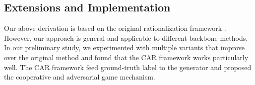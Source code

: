 \documentclass[letterpaper]{article} %
\begin{document}



\subsection{Extensions and Implementation}
Our above derivation is based on the original rationalization framework \cite{lei2016rationalizing}. However, our approach is general and applicable to different backbone methods. In our preliminary study, we experimented with multiple variants that improve over the original method and found that the CAR framework \cite{chang2019game} works particularly well. The CAR framework feed ground-truth label to the generator and proposed the cooperative and adversarial game mechanism.

\end{document}
